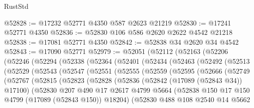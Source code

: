 \begin{lexlean}{RustStd}
\begin{coremodule}
@52828 := @17232 @52771 @4350 @587 @2623 @21219
@52830 := @17241 @52771 @4350
@52836 := @52830 @106 @586 @2620 @2622 @4542 @21218
@52838 := @17081 @52771 @4350
@52842 := @52838 @34 @2620 @34 @4542
@52843 := @17090 @52771
@52979 := @52051
    (@52112
      (@52163
        (@52206
          (@52246
            (@52294
              (@52338
                (@52364
                  (@52401
                    (@52434
                      (@52463
                        (@52492
                          (@52513
                            (@52529
                              (@52543
                                (@52547
                                  (@52551
                                    (@52555
                                      (@52559
                                        (@52595
                                          (@52666
                                            (@52749
                                              (@52767
                                                (@52815
                                                  (@52823
                                                    (@52828
                                                      (@52836
                                                        (@52842 (@17089 (@52843 @34)) @17100)
                                                        (@52830
                                                          @207
                                                          @490
                                                          @17
                                                          @2617
                                                          @4799
                                                          @5664
                                                          (@52838
                                                            @150
                                                            @17
                                                            @150
                                                            @4799
                                                            (@17089 (@52843 @150))
                                                            @18204)
                                                          (@52830
                                                            @488
                                                            @108
                                                            @2540
                                                            @14
                                                            @5662

\end{coremodule}
\end{lexlean}

